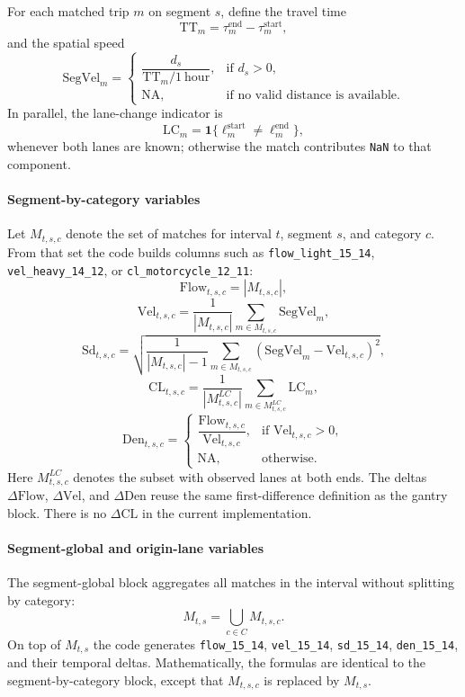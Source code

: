 For each matched trip \(m\) on segment \(s\), define the travel time
\[
\mathrm{TT}_m = \tau^{\mathrm{end}}_m - \tau^{\mathrm{start}}_m,
\]
and the spatial speed
\[
\mathrm{SegVel}_m =
\begin{cases}
\dfrac{d_s}{\mathrm{TT}_m/1\ \mathrm{hour}}, & \text{if } d_s > 0, \\
\mathrm{NA}, & \text{if no valid distance is available.}
\end{cases}
\]
In parallel, the lane-change indicator is
\[
\mathrm{LC}_m =
\mathbf{1}\{\ell^{\mathrm{start}}_m \neq \ell^{\mathrm{end}}_m\},
\]
whenever both lanes are known; otherwise the match contributes \texttt{NaN} to that component.

\paragraph{Segment-by-category variables}
Let \(M_{t,s,c}\) denote the set of matches for interval \(t\), segment \(s\), and category \(c\). From that set the code builds columns such as \texttt{flow\_light\_15\_14}, \texttt{vel\_heavy\_14\_12}, or \texttt{cl\_motorcycle\_12\_11}:
\[
\mathrm{Flow}_{t,s,c} = |M_{t,s,c}|,
\]
\[
\mathrm{Vel}_{t,s,c} = \frac{1}{|M_{t,s,c}|}\sum_{m \in M_{t,s,c}} \mathrm{SegVel}_m,
\]
\[
\mathrm{Sd}_{t,s,c} = \sqrt{\frac{1}{|M_{t,s,c}|-1}\sum_{m \in M_{t,s,c}}(\mathrm{SegVel}_m-\mathrm{Vel}_{t,s,c})^2},
\]
\[
\mathrm{CL}_{t,s,c} = \frac{1}{|M^{LC}_{t,s,c}|}\sum_{m \in M^{LC}_{t,s,c}} \mathrm{LC}_m,
\]
\[
\mathrm{Den}_{t,s,c} =
\begin{cases}
\dfrac{\mathrm{Flow}_{t,s,c}}{\mathrm{Vel}_{t,s,c}}, & \text{if } \mathrm{Vel}_{t,s,c} > 0, \\
\mathrm{NA}, & \text{otherwise.}
\end{cases}
\]
Here \(M^{LC}_{t,s,c}\) denotes the subset with observed lanes at both ends. The deltas \(\Delta \mathrm{Flow}\), \(\Delta \mathrm{Vel}\), and \(\Delta \mathrm{Den}\) reuse the same first-difference definition as the gantry block. There is no \(\Delta \mathrm{CL}\) in the current implementation.

\paragraph{Segment-global and origin-lane variables}
The segment-global block aggregates all matches in the interval without splitting by category:
\[
M_{t,s} = \bigcup_{c \in C} M_{t,s,c}.
\]
On top of \(M_{t,s}\) the code generates \texttt{flow\_15\_14}, \texttt{vel\_15\_14}, \texttt{sd\_15\_14}, \texttt{den\_15\_14}, and their temporal deltas. Mathematically, the formulas are identical to the segment-by-category block, except that \(M_{t,s,c}\) is replaced by \(M_{t,s}\).

